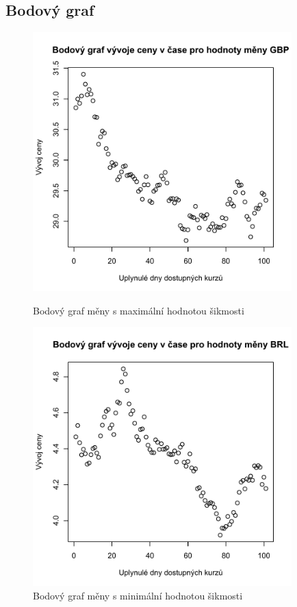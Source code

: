 \documentclass[a4paper]{ article}
\begin{document}
\subsection{Bodový graf}
\begin{figure}[H]
\centering
\includegraphics[width=10cm]{bodovy_max.pdf}
\caption{Bodový graf měny s maximální hodnotou šikmosti}
\includegraphics[width=10cm]{bodovy_min.pdf}
\caption{Bodový graf měny s minimální hodnotou šikmosti}
\end{figure}
\end{document}
